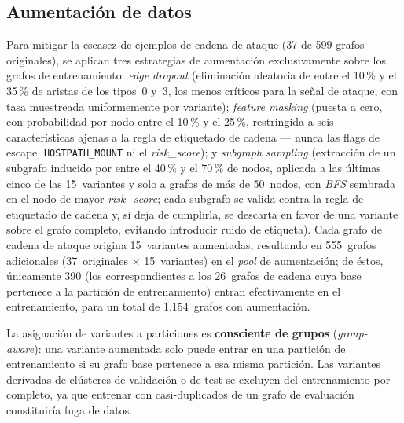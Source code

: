 \subsection{Aumentación de datos}

Para mitigar la escasez de ejemplos de cadena de ataque (37 de 599 grafos
originales), se aplican tres estrategias de aumentación exclusivamente sobre los
grafos de entrenamiento: \textit{edge dropout} (eliminación aleatoria de entre el
10\,\% y el 35\,\% de aristas de los tipos~0 y~3, los menos críticos para la señal
de ataque, con tasa muestreada uniformemente por variante);
\textit{feature masking} (puesta a cero, con probabilidad por nodo entre el 10\,\%
y el 25\,\%, restringida a seis características ajenas a la regla de etiquetado de
cadena — nunca las flags de escape, \texttt{HOSTPATH\_MOUNT} ni el \textit{risk\_score}); y
\textit{subgraph sampling} (extracción de un subgrafo inducido por entre el 40\,\%
y el 70\,\% de nodos, aplicada a las últimas cinco de las 15~variantes y solo a
grafos de más de 50~nodos, con \textit{BFS}
sembrada en el nodo de mayor \textit{risk\_score}; cada subgrafo
se valida contra la regla de etiquetado de cadena y, si deja de cumplirla, se
descarta en favor de una variante sobre el grafo completo, evitando introducir
ruido de etiqueta). Cada grafo de
cadena de ataque origina 15~variantes aumentadas, resultando en 555~grafos
adicionales (37~originales \(\times\) 15~variantes) en el \textit{pool} de
aumentación; de éstos, únicamente 390 (los correspondientes a los 26~grafos de
cadena cuya base pertenece a la partición de entrenamiento) entran efectivamente
en el entrenamiento, para un total de 1.154~grafos con aumentación.

La asignación de variantes a particiones es \textbf{consciente de grupos}
(\textit{group-aware}): una variante aumentada solo puede entrar en una partición
de entrenamiento si su grafo base pertenece a esa misma partición. Las variantes
derivadas de clústeres de validación o de test se excluyen del entrenamiento por
completo, ya que entrenar con casi-duplicados de un grafo de evaluación
constituiría fuga de datos.

